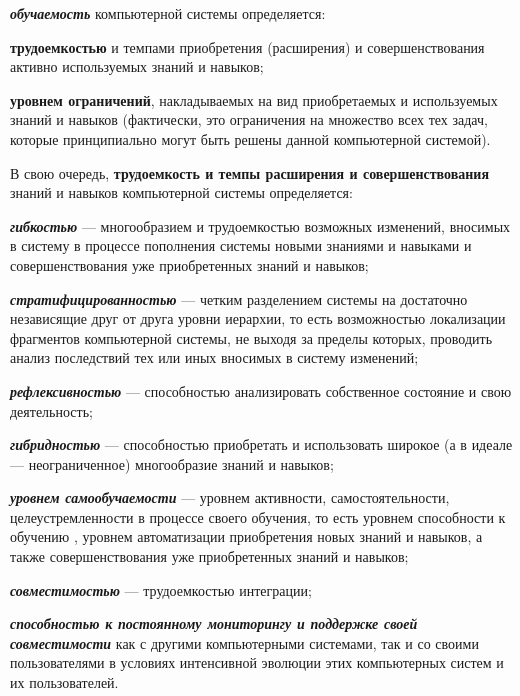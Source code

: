 \textbf{\textit{обучаемость}} компьютерной системы определяется:
\begin{textitemize}
	\item \textbf{трудоемкостью} и темпами приобретения (расширения) и совершенствования активно используемых знаний и навыков;
	\item \textbf{уровнем ограничений}, накладываемых на вид приобретаемых и используемых знаний и навыков (фактически, это ограничения на множество всех тех задач, которые принципиально могут быть решены данной компьютерной системой).
\end{textitemize}

В свою очередь, \textbf{трудоемкость и темпы расширения и совершенствования} знаний и навыков компьютерной системы определяется:
\begin{textitemize}
	\item \textbf{\textit{гибкостью}} --- многообразием и трудоемкостью возможных изменений, вносимых в систему в процессе пополнения системы новыми знаниями и навыками и совершенствования уже приобретенных знаний и навыков;
	\item \textbf{\textit{стратифицированностью}} --- четким разделением системы на достаточно независящие друг от друга уровни иерархии, то есть возможностью локализации фрагментов компьютерной системы, не выходя за пределы которых,  проводить анализ последствий тех или иных вносимых в систему изменений;
	\item \textbf{\textit{рефлексивностью}} --- способностью анализировать собственное состояние и свою деятельность;
	\item \textbf{\textit{гибридностью}} --- способностью приобретать и использовать широкое (а в идеале --- неограниченное) многообразие знаний и навыков;
	\item \textbf{\textit{уровнем самообучаемости}} --- уровнем активности, самостоятельности, целеустремленности в процессе своего обучения, то есть уровнем способности к обучению , уровнем автоматизации приобретения новых знаний и навыков, а также совершенствования уже приобретенных знаний и навыков;
	\item \textbf{\textit{совместимостью}} --- трудоемкостью интеграции;
	\item \textbf{\textit{способностью к постоянному мониторингу и поддержке своей совместимости}} как с другими компьютерными системами, так и со своими пользователями в условиях интенсивной эволюции этих компьютерных систем и их пользователей. 
\end{textitemize}

